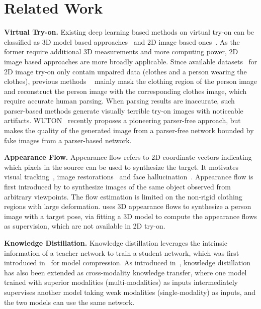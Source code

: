 \documentclass[final]{cvpr}
\begin{document}
\section{Related Work}
	{\flushleft \bf Virtual Try-on.}
	Existing deep learning based methods on virtual try-on can be classified as 3D model based approaches~\cite{design,animation,animation2019,clothcap} and 2D image based ones~\cite{viton,cpvton,clothflow,vtnfp,cpvton_plus,ACGPN,parser_free}.
As the former require additional 3D measurements and more computing power, 2D image based approaches are more broadly applicable.
Since available datasets~\cite{viton,MPV} for 2D image try-on only contain unpaired data (clothes and a person wearing the clothes), previous methods ~\cite{viton,cpvton,clothflow,vtnfp,cpvton_plus,ACGPN} mainly mask the clothing region of the person image and reconstruct the person image with the corresponding clothes image, which require accurate human parsing.
When parsing results are inaccurate, such parser-based methods generate visually terrible try-on images with noticeable artifacts.
WUTON~\cite{parser_free} recently proposes a pioneering parser-free approach, but makes the quality of the generated image from a parser-free network bounded by fake images from a parser-based network. 

	{\flushleft \bf Appearance Flow.}
Appearance flow refers to 2D coordinate vectors indicating which pixels in the source can be used to synthesize the target. It motivates visual tracking~\cite{song2017crest}, image restorations~\cite{Liu2019MEDFE,wang2020rethinking} and face hallucination~\cite{song2019joint}.
Appearance flow is first introduced by \cite{appearance} to synthesize images of the same object observed from arbitrary viewpoints.
The flow estimation is limited on the non-rigid clothing regions with large deformation.
\cite{intrinsic} uses 3D appearance flows to synthesize a person image with a target pose, via fitting a 3D model to compute the appearance flows as supervision, which are not available in 2D try-on.
	
	{\flushleft \bf Knowledge Distillation.}
Knowledge distillation leverages the intrinsic information of a teacher network to train a student network, which was first introduced in~\cite{distill} for model compression.
As introduced in~\cite{zhao2020knowledge}, knowledge distillation has also been extended as cross-modality knowledge transfer, where one model trained with superior modalities (\ie multi-modalities) as inputs intermediately supervises another model taking weak modalities (\ie single-modality) as inputs, and the two models can use the same network.
	
\end{document}
